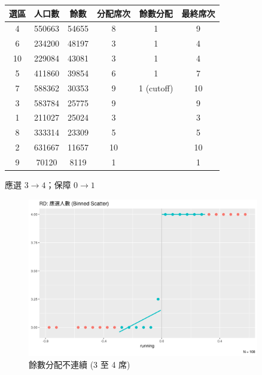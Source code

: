 \documentclass[
  10pt,
  ignorenonframetext,
  aspectratio=43,
]{beamer}
\begin{document}
\begin{frame}
\begin{longtable}[]{@{}cccccc@{}}
\toprule()
選區 & 人口數 & 餘數 & 分配席次 & 餘數分配 & 最終席次 \\
\midrule()
\endhead
4 & 550663 & 54655 & 8 & 1 & 9 \\
6 & 234200 & 48197 & 3 & 1 & 4 \\
10 & 229084 & 43081 & 3 & 1 & 4 \\
5 & 411860 & 39854 & 6 & 1 & 7 \\
7 & 588362 & 30353 & 9 & 1 (cutoff) & 10 \\
3 & 583784 & 25775 & 9 & & 9 \\
1 & 211027 & 25024 & 3 & & 3 \\
8 & 333314 & 23309 & 5 & & 5 \\
2 & 631667 & 11657 & 10 & & 10 \\
9 & 70120 & 8119 & 1 & & 1 \\
\bottomrule()
\end{longtable}
\end{frame}

\begin{frame}{應選 \(3 \rightarrow 4\)；保障 \(0 \rightarrow 1\)}
\protect\hypertarget{ux61c9ux9078-3-rightarrow-4ux4fddux969c-0-rightarrow-1}{}
\begin{figure}
\centering
\includegraphics[width=0.9\textwidth,height=\textheight]{assets/3to4.png}
\caption{餘數分配不連續 (3 至 4 席)}
\end{figure}
\end{frame}
\end{document}
